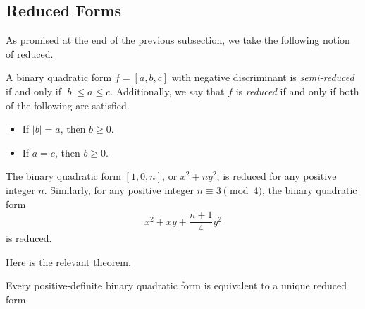 \documentclass[../notes.tex]{subfiles}
\begin{document}
\subsection{Reduced Forms}
As promised at the end of the previous subsection, we take the following notion of reduced.
\begin{definition}[reduced]
	A binary quadratic form $f=[a,b,c]$ with negative discriminant is \textit{semi-re\-duced} if and only if $\left|b\right|\le a\le c$. Additionally, we say that $f$ is \textit{reduced} if and only if both of the following are satisfied.
	\begin{itemize}
		\item If $\left|b\right|=a$, then $b\ge0$.
		\item If $a=c$, then $b\ge0$.
	\end{itemize}
\end{definition}
\begin{example}
	The binary quadratic form $[1,0,n]$, or $x^2+ny^2$, is reduced for any positive integer $n$. Similarly, for any positive integer $n\equiv3\pmod4$, the binary quadratic form
	\[x^2+xy+\frac{n+1}4y^2\]
	is reduced.
\end{example}
Here is the relevant theorem.
\begin{theorem} \label{thm:reduce-form}
	Every positive-definite binary quadratic form is equivalent to a unique reduced form.
\end{theorem}
\end{document}
